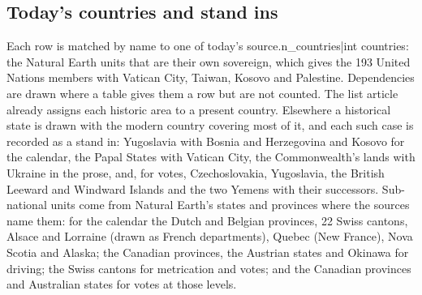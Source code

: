 \documentclass[11pt,a4paper]{article}
\begin{document}
\subsection{Today's countries and stand ins}
Each row is matched by name to one of today's {{source.n_countries|int}} countries: the Natural Earth units that are their own sovereign, which gives the 193 United Nations members with Vatican City, Taiwan, Kosovo and Palestine. Dependencies are drawn where a table gives them a row but are not counted. The list article already assigns each historic area to a present country. Elsewhere a historical state is drawn with the modern country covering most of it, and each such case is recorded as a stand in: Yugoslavia with Bosnia and Herzegovina and Kosovo for the calendar, the Papal States with Vatican City, the Commonwealth's lands with Ukraine in the prose, and, for votes, Czechoslovakia, Yugoslavia, the British Leeward and Windward Islands and the two Yemens with their successors. Sub-national units come from Natural Earth's states and provinces where the sources name them: for the calendar the Dutch and Belgian provinces, 22 Swiss cantons, Alsace and Lorraine (drawn as French departments), Quebec (New France), Nova Scotia and Alaska; the Canadian provinces, the Austrian states and Okinawa for driving; the Swiss cantons for metrication and votes; and the Canadian provinces and Australian states for votes at those levels.
\end{document}
